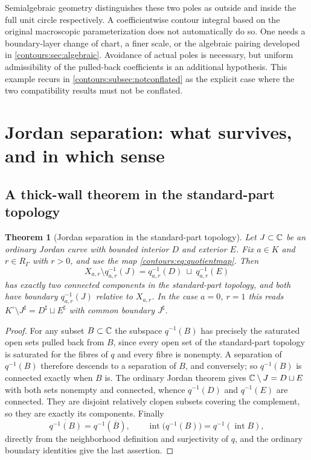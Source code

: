 \documentclass[11pt,letterpaper]{article}
\newtheorem{theorem}{Theorem}[section]
\theoremstyle{definition}
\theoremstyle{remark}
\newcommand{\sh}{^{\sharp}}\newcommand{\dd}{\,d}
\numberwithin{equation}{section}
\begin{document}
Semialgebraic geometry distinguishes these two poles as outside and inside the full
unit circle respectively. A coefficientwise contour integral based on the original
macroscopic parameterization does not automatically do so. One needs a boundary-layer
change of chart, a finer scale, or the algebraic pairing developed in
\cref{contours:sec:algebraic}. Avoidance of actual poles is necessary, but uniform
admissibility of the pulled-back coefficients is an additional hypothesis. This
example recurs in \cref{contours:subsec:notconflated} as the explicit case where
the two compatibility results must not be conflated.

\section{Jordan separation: what survives, and in which sense}
\label{contours:sec:jordan}

\subsection{A thick-wall theorem in the standard-part topology}
\begin{theorem}[Jordan separation in the standard-part topology]
\label{contours:thm:stdpartjordan}
Let $J\subset\mathbb C$ be an ordinary Jordan curve with bounded interior $D$ and exterior
$E$. Fix $a\in K$ and $r\in R_\Gamma$ with $r>0$, and use the map
\eqref{contours:eq:quotientmap}. Then
\[
  X_{a,r}\setminus q_{a,r}^{-1}(J)
  = q_{a,r}^{-1}(D)\ \sqcup\ q_{a,r}^{-1}(E)
\]
has exactly two connected components in the standard-part topology, and both have
boundary $q_{a,r}^{-1}(J)$ relative to $X_{a,r}$. In the case $a=0$, $r=1$ this
reads $K^\circ\setminus J\sh=D\sh\sqcup E\sh$ with common boundary $J\sh$.
\end{theorem}
\begin{proof}
For any subset $B\subset\mathbb C$ the subspace $q^{-1}(B)$ has precisely the saturated
open sets pulled back from $B$, since every open set of the standard-part topology
is saturated for the fibres of $q$ and every fibre is nonempty. A separation of
$q^{-1}(B)$ therefore descends to a separation of $B$, and conversely; so
$q^{-1}(B)$ is connected exactly when $B$ is. The ordinary Jordan theorem gives
$\mathbb C\setminus J=D\sqcup E$ with both sets nonempty and connected, whence $q^{-1}(D)$
and $q^{-1}(E)$ are connected. They are disjoint relatively clopen subsets covering
the complement, so they are exactly its components. Finally
\[
  \overline{q^{-1}(B)}=q^{-1}(\overline B),\qquad
  \operatorname{int}\bigl(q^{-1}(B)\bigr)=q^{-1}(\operatorname{int}B),
\]
directly from the neighborhood definition and surjectivity of $q$, and the ordinary
boundary identities give the last assertion.
\end{proof}
\end{document}
